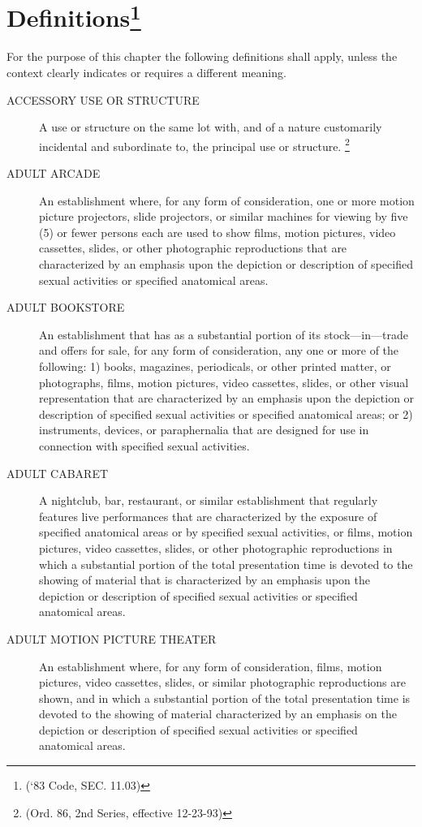 \section{Definitions\footnote{(‘83 Code, SEC. 11.03)}}
For the purpose of this chapter the following definitions shall apply, unless the context clearly indicates or requires a different meaning.
\begin{description}
    \item[ACCESSORY USE OR STRUCTURE] A use or structure on the same lot with, and of a nature customarily incidental and subordinate to, the principal use or structure. \footnote{(Ord. 86, 2nd Series, effective 12-23-93)}
    \item[ADULT ARCADE] An establishment where, for any form of consideration, one or more motion picture projectors, slide projectors, or similar machines for viewing by five (5) or fewer persons each are used to show films, motion pictures, video cassettes, slides, or other photographic reproductions that are characterized by an emphasis upon the depiction or description of specified sexual activities or specified anatomical areas.
    \item[ADULT BOOKSTORE] An establishment that has as a substantial portion of its stock—in—trade and offers for sale, for any form of consideration, any one or more of the following: 1) books, magazines, periodicals, or other printed matter, or photographs, films, motion pictures, video cassettes, slides, or other visual representation that are characterized by an emphasis upon the depiction or description of specified sexual activities or specified anatomical areas; or 2) instruments, devices, or paraphernalia that are designed for use in connection with specified sexual activities.
    \item[ADULT CABARET] A nightclub, bar, restaurant, or similar establishment that regularly features live performances that are characterized by the exposure of specified anatomical areas or by specified sexual activities, or films, motion pictures, video cassettes, slides, or other photographic reproductions in which a substantial portion of the total presentation time is devoted to the showing of material that is characterized by an emphasis upon the depiction or description of specified sexual activities or specified anatomical areas.
    \item[ADULT MOTION PICTURE THEATER] An establishment where, for any form of consideration, films, motion pictures, video cassettes, slides, or similar photographic reproductions are shown, and in which a substantial portion of the total presentation time is devoted to the showing of material characterized by an emphasis on the depiction or description of specified sexual activities or specified anatomical areas.

\end{description}
